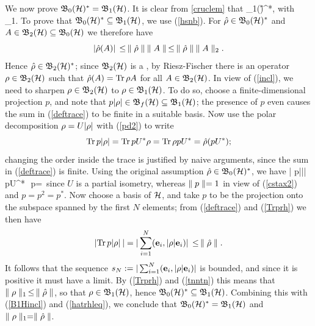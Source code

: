 We now prove ${\frak B}_0({\cal H})^*={\frak B}_1({\cal H})$. It is clear from \ref{cruclem} that \be
\B_1(\H)\subseteq \KH^*,  \ee with \be \n\hat{\rh}\n\,\leq
\n\rh\n_1.  \ee To prove that ${\frak B}_0({\cal H})^*\subseteq{\frak B}_1({\cal H})$,
we use (\ref{hsnb}). For $\hat{\rho}\in{\frak B}_0({\cal H})^*$ and
$A\in{\frak B}_2({\cal H})\subseteq{\frak B}_0({\cal H})$ we therefore have
$$
|\hat{\rho}(A)|\,\leq \,\parallel\hat{\rho}\parallel\:\parallel A\parallel\,\leq \,\parallel\hat{\rho}\parallel\:\parallel
A\parallel_2.
$$
Hence $\hat{\rho}\in{\frak B}_2({\cal H})^*$; since ${\frak B}_2({\cal H})$ is a \Hs, by
Riesz-Fischer there is an operator $\rho\in{\frak B}_2({\cal H})$ such that
$\hat{\rho}(A)=\mbox{\rm Tr}\, \rho A$ for all $A\in{\frak B}_2({\cal H})$.  In view of
(\ref{incl}), we need to sharpen $\rho\in{\frak B}_2({\cal H})$ to
$\rho\in{\frak B}_1({\cal H})$. To do so, choose a finite-dimensional projection
$p$, and note that $p|\rho|\in{\frak B}_f({\cal H})\subseteq {\frak B}_1({\cal H})$; the presence
of $p$ even causes the sum in (\ref{deftrace}) to be finite in a
suitable basis.  Now use the polar decomposition $\rho=U|\rho|$ with
(\ref{pd2}) to write
$$
\mbox{\rm Tr}\, p|\rho|=\mbox{\rm Tr}\, pU^*\rho=\mbox{\rm Tr}\,\rho pU^*=\hat{\rho}(pU^*);
$$
changing the order inside the trace is justified by naive arguments,
since the sum in (\ref{deftrace}) is finite.  Using the original
assumption $\hat{\rho}\in{\frak B}_0({\cal H})^*$, we have \be |\Tr
p|\rh|\:|\,\leq\,\n\hat{\rh}\n\: \n pU^*\n\,\leq\, \n\hat{\rh}\n\: \n
p\n=\n\hat{\rh}\n\,  \ee since $U$ is a partial isometry,
whereas $\parallel p\parallel=1$ in view of (\ref{cstax2}) and $p=p^2=p^*$. Now
choose a basis of ${\cal H}$, and take $p$ to be the projection onto the
subspace spanned by the first $N$ elements; from (\ref{deftrace}) and
(\ref{Trprh}) we then have
$$
|\mbox{\rm Tr}\, p|\rho|\:|=|\sum_{i=1}^N ({\bf e}_i,|\rho|{\bf e}_i)|\,\leq\,
\parallel\hat{\rho}\parallel.
$$
It follows that the sequence $s_N:=|\sum_{i=1}^N ({\bf e}_i,|\rho|{\bf
e}_i)|$ is bounded, and since it is positive it must have a limit. By
(\ref{Trprh}) and (\ref{tnntn}) this means that $\parallel \rho\parallel_1\,\leq\,
\parallel\hat{\rho}\parallel$, so that $\rho\in{\frak B}_1({\cal H})$, hence
${\frak B}_0({\cal H})^*\subseteq{\frak B}_1({\cal H})$.  Combining this with (\ref{B1Hincl}) and
(\ref{hatrhleq}), we conclude that ${\frak B}_0({\cal H})^*={\frak B}_1({\cal H})$ and $\parallel \rho\parallel_1=
\parallel\hat{\rho}\parallel$.

